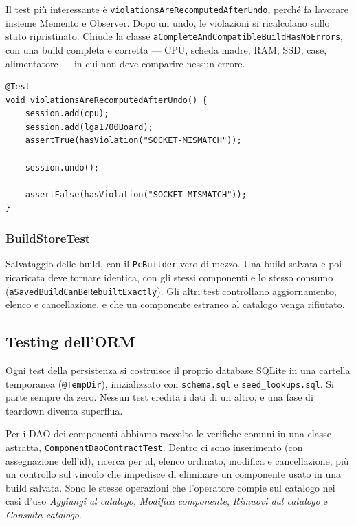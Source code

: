 \documentclass[12pt,a4paper]{article}
\begin{document}
Il test più interessante è \texttt{violationsAreRecomputedAfterUndo}, perché fa lavorare insieme Memento
e Observer. Dopo un undo, le violazioni si ricalcolano sullo stato ripristinato. Chiude la classe
\texttt{aCompleteAndCompatibleBuildHasNoErrors}, con una build completa e corretta --- CPU, scheda
madre, RAM, SSD, case, alimentatore --- in cui non deve comparire nessun errore.

\begin{lstlisting}[style=intellijlight, caption={Undo e ricalcolo delle violazioni in PcBuildSessionTest}, label={lst:test-undo}]
@Test
void violationsAreRecomputedAfterUndo() {
    session.add(cpu);
    session.add(lga1700Board);
    assertTrue(hasViolation("SOCKET-MISMATCH"));

    session.undo();

    assertFalse(hasViolation("SOCKET-MISMATCH"));
}
\end{lstlisting}

\subsubsection{BuildStoreTest}
Salvataggio delle build, con il \texttt{PcBuilder} vero di mezzo. Una build salvata e poi ricaricata
deve tornare identica, con gli stessi componenti e lo stesso consumo
(\texttt{aSavedBuildCanBeRebuiltExactly}). Gli altri test controllano aggiornamento, elenco e
cancellazione, e che un componente estraneo al catalogo venga rifiutato.

\subsection{Testing dell'ORM}
Ogni test della persistenza si costruisce il proprio database SQLite in una cartella temporanea
(\texttt{@TempDir}), inizializzato con \texttt{schema.sql} e \texttt{seed\_lookups.sql}. Si parte sempre
da zero. Nessun test eredita i dati di un altro, e una fase di teardown diventa superflua.

Per i DAO dei componenti abbiamo raccolto le verifiche comuni in una classe astratta,
\texttt{ComponentDaoContractTest}. Dentro ci sono inserimento (con assegnazione dell'id), ricerca per id,
elenco ordinato, modifica e cancellazione, più un controllo sul vincolo che impedisce di eliminare un
componente usato in una build salvata. Sono le stesse operazioni che l'operatore compie sul catalogo nei
casi d'uso \emph{Aggiungi al catalogo}, \emph{Modifica componente}, \emph{Rimuovi dal catalogo} e
\emph{Consulta catalogo}.
\end{document}
